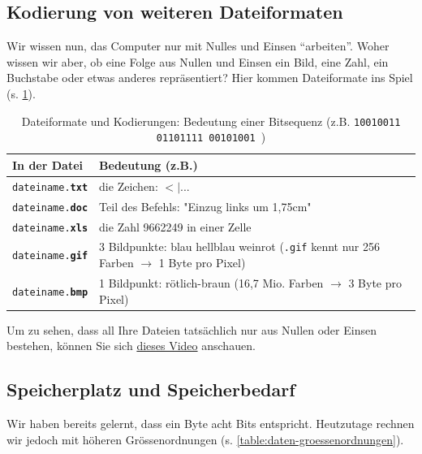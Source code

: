 \subsection{Kodierung von weiteren Dateiformaten}
Wir wissen nun, das Computer nur mit Nulles und Einsen ``arbeiten''. Woher wissen wir aber, ob eine Folge aus Nullen und Einsen ein Bild, eine Zahl, ein Buchstabe oder etwas anderes repräsentiert? Hier kommen Dateiformate ins Spiel (s. \cref{table:formats-codes}).

\begin{table}[H]
\centering
\begin{tabular}{l|p{11cm}}
\textbf{In der Datei} & \textbf{Bedeutung (z.B.)}                                                                 \\\midrule
\texttt{dateiname.\textbf{txt}}         & die Zeichen: $<|...$                                                                              \\
\texttt{dateiname.\textbf{doc}}         & Teil des Befehls: "Einzug links um 1,75cm"                                                    \\
\texttt{dateiname.\textbf{xls}}         & die Zahl 9662249 in einer Zelle                                                               \\
\texttt{dateiname.\textbf{gif}}         & 3 Bildpunkte: blau hellblau weinrot (\texttt{.gif} kennt nur 256 Farben $\rightarrow$ 1 Byte pro Pixel) \\
\texttt{dateiname.\textbf{bmp}}         & 1 Bildpunkt: rötlich-braun (16,7 Mio. Farben $\rightarrow$ 3 Byte pro Pixel)                  
\end{tabular}
\caption{Dateiformate und Kodierungen: Bedeutung einer Bitsequenz (z.B. \texttt{10010011   01101111   00101001
})}
\label{table:formats-codes}
\end{table}

\begin{myexercise}
Um zu sehen, dass all Ihre Dateien tatsächlich nur aus Nullen oder Einsen bestehen, können Sie sich \href{https://moodle.ksimlee.ch/pluginfile.php/56580/mod_lesson/page_contents/2836/VideoXxdDemo.mov}{dieses Video} anschauen.
\end{myexercise}


\subsection{Speicherplatz und Speicherbedarf}
Wir haben bereits gelernt, dass ein Byte acht Bits entspricht. Heutzutage rechnen wir jedoch mit höheren Grössenordnungen (s. \cref{table:daten-groessenordnungen}).

